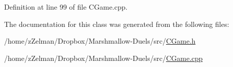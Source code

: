 Definition at line 99 of file C\-Game.\-cpp.



The documentation for this class was generated from the following files\-:\begin{DoxyCompactItemize}
\item 
/home/z\-Zelman/\-Dropbox/\-Marshmallow-\/\-Duels/src/\hyperlink{CGame_8h}{C\-Game.\-h}\item 
/home/z\-Zelman/\-Dropbox/\-Marshmallow-\/\-Duels/src/\hyperlink{CGame_8cpp}{C\-Game.\-cpp}\end{DoxyCompactItemize}
